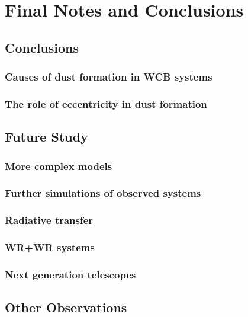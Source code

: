 \chapter{Final Notes and Conclusions}

\section{Conclusions}

\subsection{Causes of dust formation in WCB systems}

\subsection{The role of eccentricity in dust formation}

\section{Future Study}

\subsection{More complex models}

\subsection{Further simulations of observed systems}

\subsection{Radiative transfer}

\subsection{WR+WR systems}

\subsection{Next generation telescopes}

\section{Other Observations}

